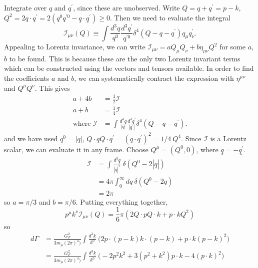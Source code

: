 \documentclass[a4paper,12pt]{article}
\begin{document}
Integrate over $q$ and $q^\prime$, since these are unobserved. Write $Q = q + q^\prime = p - k$, $Q^2 = 2 q \cdot q^\prime = 2(q^0 q^{\prime 0} -\underline{q}\cdot \underline{q}^\prime) \geq 0$. Then we need to evaluate the integral
\begin{equation}
	\mathcal{I}_{\mu \nu}(Q) \equiv \int \frac{d^3q}{q^0} \frac{d^3 q^\prime}{q^{\prime 0}} \delta^4(Q - q - q^\prime) q_\mu q^\prime_\nu.
\end{equation}
Appealing to Lorentz invariance, we can write $\mathcal{I}_{\mu \nu} = a Q_\mu Q_\nu + b \eta_{\mu \nu} Q^2$ for some $a$, $b$ to be found. This is because these are the only two Lorentz invariant terms which can be constructed using the vectors and tensors available. In order to find the coefficients $a$ and $b$, we can systematically contract the expression with $\eta^{\mu \nu}$ and $Q^\mu Q^\nu$. This gives
\begin{equation}
\begin{split}
a + 4b &= \frac{1}{2}\mathcal{I} \\
a + b &= \frac{1}{4}\mathcal{I} \\
\text{where } \mathcal{I} &= \int \frac{d^3q}{|q|} \frac{d^3 q^\prime}{|q^\prime|} \delta^4(Q - q - q^\prime).
\end{split}
\end{equation}
and we have used $q^0 = |q|$, $Q \cdot q Q \cdot q^\prime = (q \cdot q^\prime)^2 = 1/4\ Q^4$. Since $\mathcal{I}$ is a Lorentz scalar, we can evaluate it in any frame. Choose $Q^\mu = (Q^0, \underline{0})$, where $\underline{q} = - \underline{q^\prime}$.
\begin{equation}
\begin{split}
\mathcal{I} &= \int \frac{d^3\underline{q}}{|\underline{q}|^2}\ \delta(Q^0 - 2 |\underline{q}|) \\
&= 4 \pi \int_0^\infty dq\ \delta(Q^0 - 2q) \\
&= 2 \pi
\end{split}
\end{equation}
so $a = \pi /3$ and $b= \pi /6$. Putting everything together,
\begin{equation}
p^\mu k^\nu \mathcal{I}_{\mu \nu}(Q) = \frac{1}{6} \pi (2 Q \cdot p Q \cdot k + p \cdot k Q^2)
\end{equation}
so 
\begin{equation}
\begin{split}
    d\Gamma &= \frac{G_F^2}{3 m_\mu (2\pi)^4)} \int \frac{d^3\underline{k}}{k^0}\ \bigg(2p \cdot (p-k) k \cdot (p-k) + p \cdot k (p-k)^2\bigg) \\
    &= \frac{G_F^2}{3 m_\mu (2\pi)^4)}  \int \frac{d^3\underline{k}}{k^0}\ \bigg(-2p^2k^2 + 3(p^2+k^2)p \cdot k -4(p \cdot k)^2\bigg)
\end{split}
\end{equation}
\end{document}
